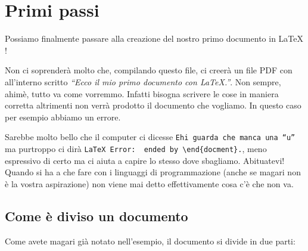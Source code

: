 \chapter{Primi passi}
Possiamo finalmente passare alla creazione del nostro primo documento in \LaTeX
!

Non ci soprenderà molto che, compilando questo file, ci creerà un file PDF con 
all'interno scritto \textit{``Ecco il mio primo documento con \LaTeX.''}. Non 
sempre, ahimè, tutto va come vorremmo. Infatti bisogna scrivere le cose in 
maniera corretta altrimenti non verrà prodotto il documento che vogliamo. In 
questo caso per esempio abbiamo un errore.

Sarebbe molto bello che il computer ci dicesse \texttt{Ehi guarda che manca 
una ``u''} ma purtroppo ci dirà 
\verb!LaTeX Error:  ended by \end{docment}.!, meno espressivo 
di certo ma ci aiuta a capire lo stesso dove sbagliamo. Abituatevi! Quando si 
ha a che fare con i linguaggi di programmazione (anche se magari non è la 
vostra aspirazione) non viene mai detto effettivamente cosa c'è che non va.

\section{Come è diviso un documento}
Come avete magari già notato nell'esempio, il documento si divide in due parti:

